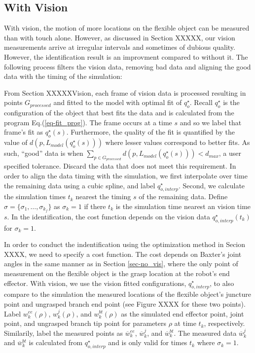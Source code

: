 \documentclass[runningheads,a4paper]{llncs}
\begin{document}
\subsection{With Vision \label{sec-w_vis}}
With vision, the motion of more locations on the flexible object can be measured than with touch alone. However, as discussed in Section XXXXX, our vision measurements arrive at irregular intervals and sometimes of dubious quality. However, the identification result is an improvment compared to without it. The following process filters the vision data, removing bad data and aligning the good data with the timing of the simulation:

From Section XXXXXVision, each frame of vision data is processed resulting in points $G_{processed}$ and fitted to the model with optimal fit of $q_o^\star$. Recall $q_o^\star$ is the configuration of the object that best fits the data and is calculated from the program Eq.(\ref{eq-fit_prog}). The frame occurs at a time $s$ and so we label that frame's fit as $q_o^\star(s)$.  Furthermore, the quality of the fit is quantified by the value of $d(p,L_{model}(q_o^\star(s)))$ where lesser values correspond to better fits.  As such, ``good'' data is when $\sum_{p\in G_{processed}}d(p,L_{model}(q_o^\star(s)))<d_{max}$, a user specified tolerance. Discard the data that does not meet this requirement.  In order to align the data timing with the simulation, we first interpolate over time the remaining data using a cubic spline, and label $q_{o,interp}^\star$.  Second, we calculate the simulation times $t_k$ nearest the timing $s$ of the remaining data. Define $\sigma = \{\sigma_1,\ldots,\sigma_{k_f}\}$ as $\sigma_k = 1$ if there $t_k$ is the simulation time nearest an vision time $s$.  In the identification, the cost function depends on the vision data $q_{o,interp}^\star(t_k)$ for $\sigma_k = 1$.

In order to conduct the indentification using the optimization method in Secion XXXX, we need to specify a cost function.  The cost depends on Baxter's joint angles in the same manner as in Section \ref{sec-no_vis}, where the only point of measurement on the flexible object is the grasp location at the robot's end effector. With vision, we use the vision fitted configurations, $q_{o,interp}^\star$, to also compare to the simulation the measured locations of the flexible object's juncture point and ungrasped branch end point (see Figure XXXX for these two points). Label $w_k^{ee}(\rho)$, $w_k^j (\rho)$, and $w_k^{bt}(\rho)$ as the simulated end effector point, joint point, and ungrasped branch tip point for parameters $\rho$ at time $t_k$, respectively. Similarily, label the measured points as $\overline{w}_k^{ee}$, $\overline{w}_k^j$, and $\overline{w}_k^{bt}$. The measured data $\overline{w}_k^{j}$ and $\overline{w}_k^{bt}$ is calculated from $q_{o,interp}^\star$ and is only valid for times $t_k$ where $\sigma_k = 1$.  
\end{document}
